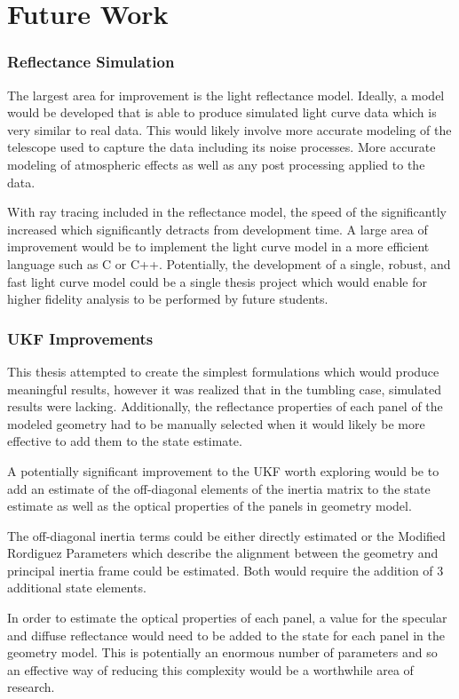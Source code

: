 \chapter{Future Work}

\subsection{Reflectance Simulation}
The largest area for improvement is the light reflectance model. Ideally, a model would be developed that is able to produce simulated light curve data which is very similar to real data. This would likely involve more accurate modeling of the telescope used to capture the data including its noise processes. More accurate modeling of atmospheric effects as well as any post processing applied to the data. 

With ray tracing included in the reflectance model, the speed of the significantly increased which significantly detracts from development time. A large area of improvement would be to implement the light curve model in a more efficient language such as C or C++. Potentially, the development of a single, robust, and fast light curve model could be a single thesis project which would enable for higher fidelity analysis to be performed by future students.

\subsection{UKF Improvements}

This thesis attempted to create the simplest formulations which would produce meaningful results, however it was realized that in the tumbling case, simulated results were lacking. Additionally, the reflectance properties of each panel of the modeled geometry had to be manually selected when it would likely be more effective to add them to the state estimate. 

A potentially significant improvement to the UKF worth exploring would be to add an estimate of the off-diagonal elements of the inertia matrix to the state estimate as well as the optical properties of the panels in geometry model.

The off-diagonal inertia terms could be either directly estimated or the Modified Rordiguez Parameters which describe the alignment between the geometry and principal inertia frame could be estimated. Both would require the addition of 3 additional state elements.

In order to estimate the optical properties of each panel, a value for the specular and diffuse reflectance would need to be added to the state for each panel in the geometry model. This is potentially an enormous number of parameters and so an effective way of reducing this complexity would be a worthwhile area of research.